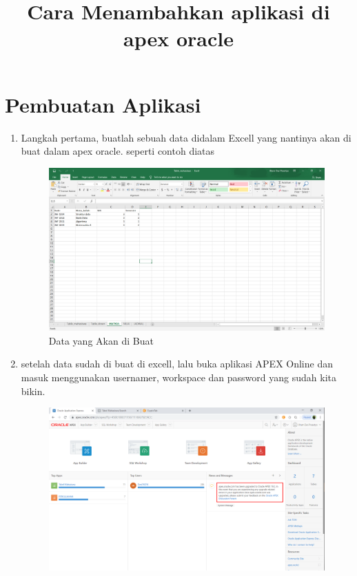 \documentclass{article}
\title{Cara Menambahkan aplikasi di apex oracle}
\begin{document}
\maketitle

\section{Pembuatan Aplikasi}

\begin{enumerate}
    \item Langkah pertama, buatlah sebuah data didalam Excell yang nantinya akan di buat dalam apex oracle. seperti contoh diatas
    \begin{figure}[h]
	\centering
		\includegraphics[scale=0.5]{gambar/1.PNG}
		\caption{Data yang Akan di Buat}
\end{figure}
	\item setelah data sudah di buat di excell, lalu buka aplikasi APEX Online dan masuk menggunakan usernamer, workspace dan password yang sudah kita bikin.
	 \begin{figure}[h]
	\centering
		\includegraphics[scale=0.5]{gambar/2.PNG}

\end{figure}
\end{enumerate}
\end{document}
